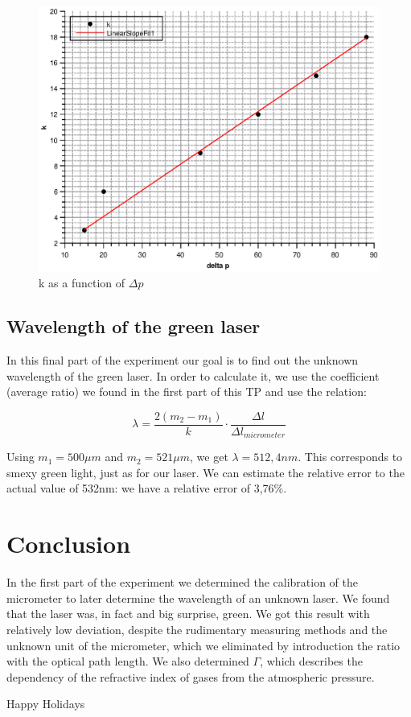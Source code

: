\documentclass{scrartcl}
\begin{document}
\begin{figure}[ht]
    \centering
    \includegraphics{gammGraph.eps}
    \caption{k as a function of $\Delta p$}
    \label{fig:my_label}
\end{figure}


\subsection{Wavelength of the green laser}
In this final part of the experiment our goal is to find out the unknown wavelength of the green laser. In order to calculate it, we use the coefficient (average ratio) we found in the first part of this TP and use the relation:

\begin{equation}
    \lambda= \frac{2(m_2-m_1)}{k} \cdot \frac{\Delta l}{\Delta l_{micrometer}}
\end{equation}

Using $m_1 = 500 \mu m$ and $m_2 = 521 \mu m$, we get $\lambda = 512,4nm$. This corresponds to smexy green light, just as for our laser. We can estimate the relative error to the actual value of 532nm: we have a relative error of 3,76\%. 
\section{Conclusion}
In the first part of the experiment we determined the calibration of the micrometer to later determine the wavelength of an unknown laser.
We found that the laser was, in fact and big surprise, green. We got this result with relatively low deviation, despite the rudimentary measuring methods and the unknown unit of the micrometer, which we eliminated by introduction the ratio with the optical path length.
We also determined $\Gamma$, which describes the dependency of the refractive index 
of gases from the atmospheric pressure. 

\centering



Happy Holidays

\end{document}
